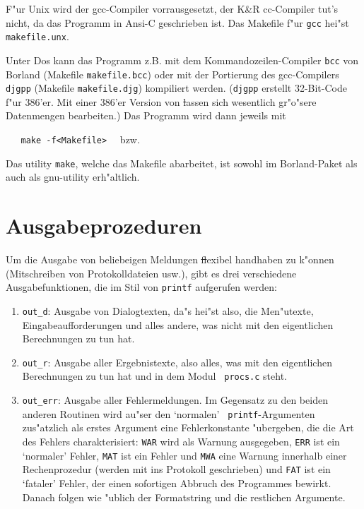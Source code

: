 

F"ur {\sc Unix} wird der gcc-Compiler vorrausgesetzt, der K\&R cc-Compiler
tut's nicht, da das Programm in Ansi-C geschrieben ist. Das Makefile
f"ur {\tt gcc} hei"st {\tt makefile.unx}.

Unter {\sc Dos} kann das Programm z.B. mit dem Kommandozeilen-Compiler
{\tt bcc} von {\sc Borland} (Makefile {\tt makefile.bcc}) oder mit der
Portierung des gcc-Compilers {\tt djgpp} (Makefile {\tt makefile.djg})
kompiliert werden. ({\tt djgpp} erstellt 32-Bit-Code f"ur 386'er. Mit
einer 386'er Version von \st lassen sich wesentlich gr"o"sere
Datenmengen bearbeiten.)  Das Programm wird dann jeweils mit


{\tt \ \ \ make -f<Makefile>}  \ \ bzw. \par

Das utility {\tt make}, welche das Makefile abarbeitet, ist sowohl im
{\sc Borland}-Paket als auch als gnu-utility erh"altlich.



\section{Ausgabeprozeduren}
Um die Ausgabe von beliebeigen Meldungen \st flexibel handhaben zu
k"onnen (Mitschreiben von Protokolldateien usw.), gibt es drei
verschiedene Ausgabefunktionen, die im Stil von {\tt printf} aufgerufen
werden:


\begin{enumerate}
\item {\tt out\_d}: Ausgabe von Dialogtexten, da"s hei"st also, die
  Men"utexte, Eingabeaufforderungen und alles andere, was nicht mit
  den eigentlichen Berechnungen zu tun hat.
\item {\tt out\_r}: Ausgabe aller Ergebnistexte, also alles, was mit
  den eigentlichen Berechnungen zu tun hat und in dem Modul {\tt
    procs.c} steht.
\item {\tt out\_err}: Ausgabe aller Fehlermeldungen. Im Gegensatz zu
  den beiden anderen Routinen wird au"ser den `normalen' {\tt
    printf}-Argumenten zus"atzlich als erstes Argument eine
  Fehlerkonstante "ubergeben, die die Art des Fehlers charakterisiert:
  {\tt WAR} wird als Warnung ausgegeben, {\tt ERR} ist ein `normaler'
  Fehler, {\tt MAT} ist ein Fehler und {\tt MWA} eine Warnung
  innerhalb einer Rechenprozedur (werden mit ins Protokoll geschrieben)
  und {\tt FAT} ist ein `fataler' Fehler, der einen sofortigen Abbruch
  des Programmes bewirkt. Danach folgen wie "ublich der Formatstring
  und die restlichen Argumente.
\end{enumerate}


